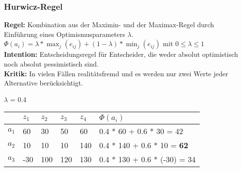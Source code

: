 \subsubsection{Hurwicz-Regel}
\textbf{Regel:} Kombination aus der Maximin- und der Maximax-Regel durch Einführung eines Optimismusparameters $\lambda$. \\
$\Phi(a_i) = \lambda * \max_j(e_{ij}) + (1 - \lambda) * \min_j(e_{ij})$ mit $0 \leq \lambda \leq 1$ \\
\textbf{Intention:} Entscheidungsregel für Entscheider, die weder absolut optimistisch noch absolut pessimistisch sind.\\
\textbf{Kritik:} In vielen Fällen realitätsfremd und es werden nur zwei Werte jeder Alternative berücksichtigt.
\begin{example} 
	$\lambda$ = 0.4 \\
	\begin{tabular}{|l|l|l|l|l|l|}
		\hline
		& $z_1$ & $z_2$ & $z_3$ & $z_4$ & $\Phi(a_i)$ \\ \hline
		$a_1$ & 60 & 30 & 50 & 60 & 0.4 * 60 + 0.6 * 30 = 42 \\ \hline
		$a_2$ & 10 & 10 & 10 & 140 & 0.4 * 140 + 0.6 * 10 = \textbf{62} \\ \hline
		$a_3$ & -30 & 100 & 120 & 130 & 0.4 * 130 + 0.6 * (-30) = 34 \\ \hline		
	\end{tabular}
\end{example}


